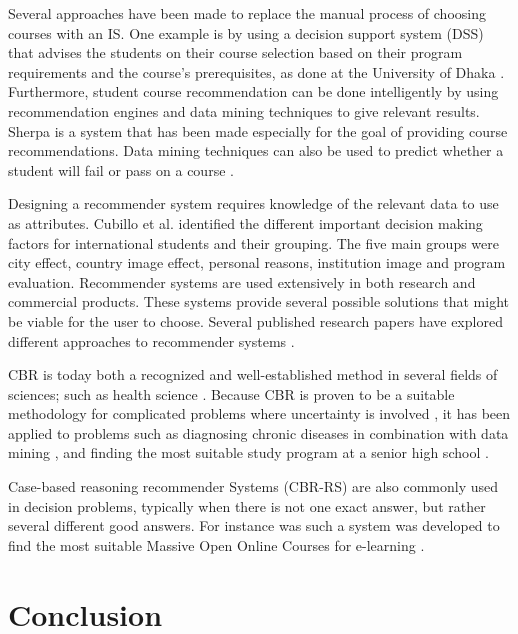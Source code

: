 Several approaches have been made to replace the manual process of choosing courses with an IS. One example is by using a decision support system (DSS) that advises the students on their course selection based on their program requirements and the course's prerequisites, as done at the University of Dhaka \cite{roushan2014university}. Furthermore, student course recommendation can be done intelligently by using recommendation engines and data mining techniques to give relevant results. Sherpa \cite{bramucci2012sherpa} is a system that has been made especially for the goal of providing course recommendations. Data mining techniques can also be used to predict whether a student will fail or pass on a course \cite{vialardi2009recommendation}.

Designing a recommender system requires knowledge of the relevant data to use as attributes. Cubillo et al. \cite{maria2006international} identified the different important decision making factors for international students and their grouping. The five main groups were city effect, country image effect, personal reasons, institution image and program evaluation. Recommender systems are used extensively in both research and commercial products. These systems provide several possible solutions that might be viable for the user to choose. Several published research papers have explored different approaches to recommender systems \cite{mulyana2015case}\cite{quijano2011happy}. 

CBR is today both a recognized and well-established method in several fields of sciences; such as health science \cite{begum2011case}. Because CBR is proven to be a suitable methodology for complicated problems where uncertainty is involved \cite{richter2013case}, it has been applied to problems such as diagnosing chronic diseases in combination with data mining \cite{huang2007integrating}, and finding the most suitable study program at a senior high school \cite{mulyana2015case}. 

Case-based reasoning recommender Systems (CBR-RS) are also commonly used in decision problems, typically when there is not one exact answer, but rather several different good answers. For instance was such a system was developed to find the most suitable Massive Open Online Courses for e-learning \cite{bousbahi2015mooc}.

\section{Conclusion}

